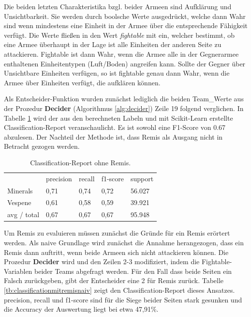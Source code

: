 Die beiden letzten Charakteristika bzgl. beider Armeen sind Aufklärung und Unsichtbarkeit. Sie werden durch boolsche Werte ausgedrückt, welche dann Wahr sind wenn mindestens eine Einheit in der Armee über die entsprechende Fähigkeit verfügt. Die Werte fließen in den Wert \textit{fightable} mit ein, welcher bestimmt, ob eine Armee überhaupt in der Lage ist alle Einheiten der anderen Seite zu attackieren. Fightable ist dann Wahr, wenn die Armee alle in der Gegnerarmee enthaltenen Einheitentypen (Luft/Boden) angreifen kann. Sollte der Gegner über Unsichtbare Einheiten verfügen, so ist fightable genau dann Wahr, wenn die Armee über Einheiten verfügt, die aufklären können.

Als Entscheider-Funktion wurden zunächst lediglich die beiden Team\_Werte aus der Prozedur \textbf{Decider} (Algorithmus \ref{alg:decider}) Zeile 19 folgend verglichen. In Tabelle \ref{tb:classificationohneremis} wird der aus den berechneten Labeln und mit Scikit-Learn erstellte Classification-Report veranschaulicht. Es ist sowohl eine F1-Score von 0.67 abzulesen. Der Nachteil der Methode ist, dass Remis als Ausgang nicht in Betracht gezogen werden.  

\begin{table}
\centering
\caption{Classification-Report ohne Remis.}
\begin{tabular}{@{}lllll@{}}
\hline
& precision & recall & f1-score & support\\
Minerals & 0,71 & 0,74 & 0,72 & 56.027\\
Vespene & 0,61 & 0,58 & 0,59 & 39.921\\
 avg / total & 0,67 & 0,67 & 0,67 & 95.948\\
\hline
\end{tabular}
\label{tb:classificationohneremis}
\end{table}

Um Remis zu evaluieren müssen zunächst die Gründe für ein Remis erörtert werden. Als naive Grundlage wird zunächst die Annahme herangezogen, dass ein Remis dann auftritt, wenn beide Armeen sich nicht attackieren können. Die Prozedur \textbf{Decider} wird und den Zeilen 2-3 modifiziert, indem die Fightable-Variablen beider Teams abgefragt werden. Für den Fall dass beide Seiten ein Falsch zurückgeben, gibt der Entscheider eine 2 für Remis zurück. Tabelle \ref{tb:classificationmitremisnaiv} zeigt den Classification-Report dieses Ansatzes.  precision, recall und f1-score sind für die Siege beider Seiten stark gesunken und die Accuracy der Auswertung liegt bei etwa 47,91\%.  

